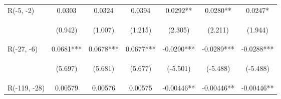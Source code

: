 \documentclass[]{article}
\begin{document}
\begin{center}
\begin{tabular}{lcccccc}
        R(-5, -2)        & 0.0303                                         & 0.0324                                         & 0.0394                                         & 0.0292**                                       & 0.0280**                                       & 0.0247*                                        \\
        \vspace{4pt}     & \begin{footnotesize}(0.942)\end{footnotesize}  & \begin{footnotesize}(1.007)\end{footnotesize}  & \begin{footnotesize}(1.215)\end{footnotesize}  & \begin{footnotesize}(2.305)\end{footnotesize}  & \begin{footnotesize}(2.211)\end{footnotesize}  & \begin{footnotesize}(1.944)\end{footnotesize}  \\
        R(-27, -6)       & 0.0681***                                      & 0.0678***                                      & 0.0677***                                      & -0.0290***                                     & -0.0289***                                     & -0.0288***                                     \\
        \vspace{4pt}     & \begin{footnotesize}(5.697)\end{footnotesize}  & \begin{footnotesize}(5.681)\end{footnotesize}  & \begin{footnotesize}(5.677)\end{footnotesize}  & \begin{footnotesize}(-5.501)\end{footnotesize} & \begin{footnotesize}(-5.488)\end{footnotesize} & \begin{footnotesize}(-5.488)\end{footnotesize} \\
        R(-119, -28)     & 0.00579                                        & 0.00576                                        & 0.00575                                        & -0.00446**                                     & -0.00446**                                     & -0.00446**                                     \\

\end{tabular}
\end{center}
\end{document}
